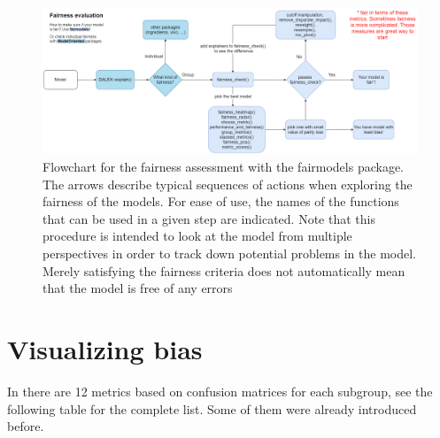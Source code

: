 \begin{Schunk}
\begin{figure}

{\centering \includegraphics[width=1\linewidth]{flow} 

}

\caption[Flowchart for the fairness assessment with the fairmodels package]{Flowchart for the fairness assessment with the fairmodels package. The arrows describe typical sequences of actions when exploring the fairness of the models. For ease of use, the names of the functions that can be used in a given step are indicated. Note that this procedure is intended to look at the model from multiple perspectives in order to track down potential problems in the model. Merely satisfying the fairness criteria does not automatically mean that the model is free of any errors}\label{fig:flowchart}
\end{figure}
\end{Schunk}

\hypertarget{visualization}{%
\section{Visualizing bias}\label{visualization}}

In  there are 12 metrics based on confusion matrices for
each subgroup, see the following table for the complete list. Some of
them were already introduced before.


